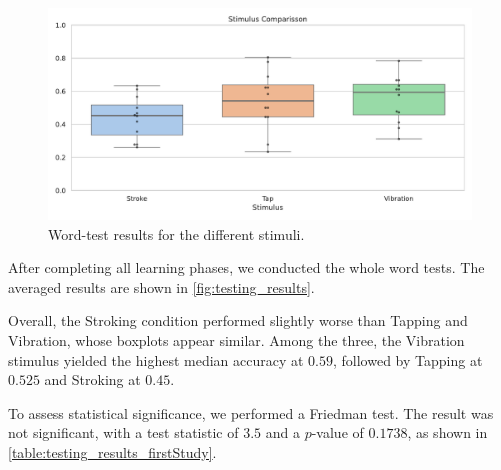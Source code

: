 \begin{figure}
    \centering
    \includegraphics[width=0.5\linewidth]{src/pictures/Study1Data_Experiment/test_data_averaged.pdf}
    \caption{Word-test results for the different stimuli.}
    \label{fig:testing_results}
\end{figure}

After completing all learning phases, we conducted the whole word tests. The averaged results are shown in \autoref{fig:testing_results}.

Overall, the Stroking condition performed slightly worse than Tapping and Vibration, whose boxplots appear similar. Among the three, the Vibration stimulus yielded the highest median accuracy at $0.59$, followed by Tapping at $0.525$ and Stroking at $0.45$.

To assess statistical significance, we performed a Friedman test. The result was not significant, with a test statistic of $3.5$ and a $p$-value of $0.1738$, as shown in \autoref{table:testing_results_firstStudy}.


\begin{table}[ht]
\caption{Results of the Friedman significance tests during learning with a Kendall's W Effect Size.}
\label{table:testing_results_firstStudy}
\end{table}


